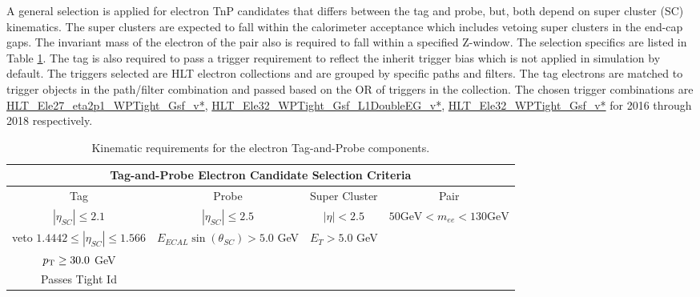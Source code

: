 A general selection is applied for electron TnP candidates that differs between the tag and probe, but, both depend on super cluster (SC) kinematics. The super clusters are expected to fall within the calorimeter acceptance which includes vetoing super clusters in the end-cap gaps. The invariant mass of the electron of the pair also is required to fall within a specified Z-window. The selection specifics are listed in Table \ref{tab:eleTnPSelect}.  The tag is also required to pass a trigger requirement to reflect the inherit trigger bias which is not applied in simulation by default. The triggers selected are HLT electron collections and are grouped by specific paths and filters. The tag electrons are matched to trigger objects in the path/filter combination and passed based on the OR of triggers in the collection. The chosen trigger combinations are \url{HLT_Ele27_eta2p1_WPTight_Gsf_v*}, \url{HLT_Ele32_WPTight_Gsf_L1DoubleEG_v*}, \url{HLT_Ele32_WPTight_Gsf_v*} for 2016 through 2018 respectively.\\

\begin{table}
\caption{Kinematic requirements for the electron Tag-and-Probe components.}
\label{tab:eleTnPSelect}
\begin{adjustwidth}{-0.45in}{-1in}
\begin{tabular}{|c|c|c|c|}
\hline 
\multicolumn{4}{|c|}{Tag-and-Probe Electron Candidate Selection Criteria} \\ 
\hline 
Tag & Probe & Super Cluster & Pair \\ 
\hline 
$|\eta_{SC}| \leq 2.1$ & $|\eta_{SC}| \leq 2.5$  & $|\eta|<2.5 $ & $50 \text{GeV} < m_{ee} < 130 \text{GeV} $ \\
veto $ 1.4442 \leq |\eta_{SC}| \leq 1.566 $ & $E_{ECAL}\sin(\theta_{SC}) > 5.0 $ GeV & $E_T > 5.0 $ GeV &  \\
 $p_{\mathrm{T}} \geq 30.0$ GeV &  &  &  \\
 Passes Tight Id &  &  & \\
\hline 
\end{tabular} 
\end{adjustwidth}
\end{table}





